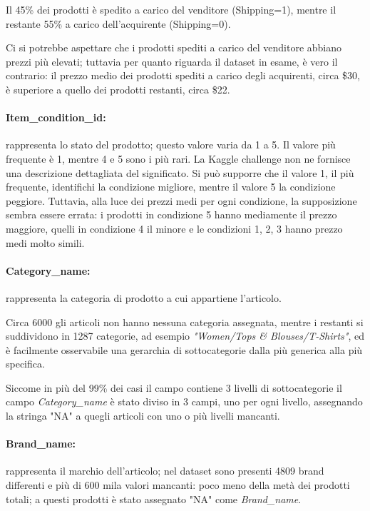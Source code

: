Il 45\% dei prodotti è spedito a carico del venditore (Shipping=1), mentre il
restante 55\% a carico dell'acquirente (Shipping=0).

Ci si potrebbe aspettare che i prodotti spediti a carico del venditore abbiano
prezzi più elevati; tuttavia  per quanto riguarda il dataset in
esame, è vero il contrario: il prezzo medio dei prodotti spediti a carico degli
acquirenti, circa \$30, è superiore a quello dei prodotti restanti,
circa \$22.


\paragraph{Item\_condition\_id:} rappresenta lo stato del prodotto; questo valore
varia da 1 a 5. Il valore più frequente è 1, mentre 4 e 5 sono i più rari. La
Kaggle challenge non ne fornisce una descrizione dettagliata del significato. Si
può supporre che il valore 1, il più frequente, identifichi la condizione
migliore, mentre il valore 5 la condizione peggiore. Tuttavia, alla luce dei
prezzi medi per ogni condizione, la supposizione sembra essere errata: i
prodotti in condizione 5 hanno mediamente il prezzo maggiore, quelli in
condizione 4 il minore e le condizioni 1, 2, 3 hanno prezzo medi molto simili.

\paragraph{Category\_name:} rappresenta la categoria di prodotto a cui appartiene
l'articolo.

Circa 6000 gli articoli non hanno nessuna categoria assegnata, mentre i
restanti si suddividono in 1287 categorie, ad esempio \textit{"Women/Tops \&
Blouses/T-Shirts"}, ed è facilmente osservabile una gerarchia di
sottocategorie dalla più generica alla più specifica.


Siccome in più del 99\% dei casi il campo contiene 3 livelli di sottocategorie
il campo \textit{Category\_name} è stato diviso in 3 campi, uno per ogni livello,
assegnando la stringa "NA" a quegli articoli con uno o più livelli mancanti.

\paragraph{Brand\_name:} rappresenta il marchio dell'articolo; nel dataset sono
presenti 4809 brand differenti e più di 600 mila valori mancanti: poco meno
della metà dei prodotti totali; a questi prodotti è stato assegnato "NA" come \textit{Brand\_name}.

